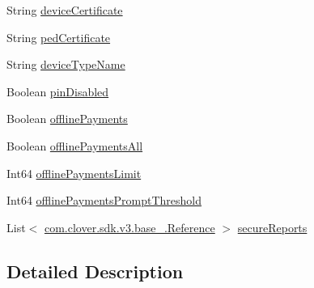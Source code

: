 \begin{DoxyCompactItemize}
String \hyperlink{classcom_1_1clover_1_1sdk_1_1v3_1_1device_1_1_device_a7005370d4bd31497c46e6ffd4336d398}{device\+Certificate}
\item 
String \hyperlink{classcom_1_1clover_1_1sdk_1_1v3_1_1device_1_1_device_a0d66773959f15b7df0a41a05a2edf70e}{ped\+Certificate}
\item 
String \hyperlink{classcom_1_1clover_1_1sdk_1_1v3_1_1device_1_1_device_a0dd371a939c4d4ed3affb8531c8b9535}{device\+Type\+Name}
\item 
Boolean \hyperlink{classcom_1_1clover_1_1sdk_1_1v3_1_1device_1_1_device_ae3711f23f198ec3fce50cf8a39350ff1}{pin\+Disabled}
\item 
Boolean \hyperlink{classcom_1_1clover_1_1sdk_1_1v3_1_1device_1_1_device_a9bc644ecdbfe4c848bb14851db10e40c}{offline\+Payments}
\item 
Boolean \hyperlink{classcom_1_1clover_1_1sdk_1_1v3_1_1device_1_1_device_af0d9ebf7d16f3ed6f7d521df645e6187}{offline\+Payments\+All}
\item 
Int64 \hyperlink{classcom_1_1clover_1_1sdk_1_1v3_1_1device_1_1_device_a1741931c3816701b59b51a8ecc8e4c72}{offline\+Payments\+Limit}
\item 
Int64 \hyperlink{classcom_1_1clover_1_1sdk_1_1v3_1_1device_1_1_device_a3d8153a393ea36f5efc33a92fa85a809}{offline\+Payments\+Prompt\+Threshold}
\item 
List$<$ \hyperlink{classcom_1_1clover_1_1sdk_1_1v3_1_1base___1_1_reference}{com.\+clover.\+sdk.\+v3.\+base\+\_\+.\+Reference} $>$ \hyperlink{classcom_1_1clover_1_1sdk_1_1v3_1_1device_1_1_device_ac5846019832c808815c4be724fdb6eb9}{secure\+Reports}
\end{DoxyCompactItemize}


\subsection{Detailed Description}


